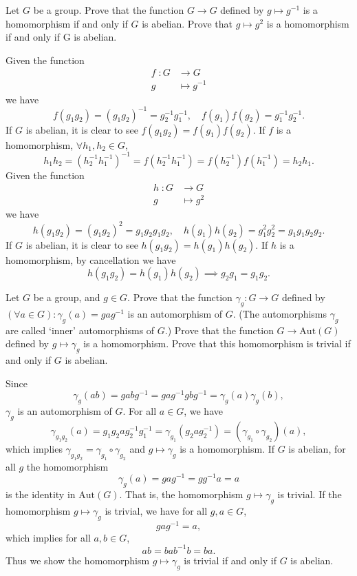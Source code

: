 \documentclass[12pt,letterpaper,boxed]{hmcpset}
\begin{document}
\begin{problem}[4.7]	
	Let $G$ be a group. Prove that the function $G\rightarrow G$ defined by $g\mapsto g^{-1}$ is a homomorphism if and only if $G$ is abelian. Prove that $g\mapsto g^2$ is a homomorphism
	if and only if G is abelian.
\end{problem}
\begin{solution}
	Given the function
	\[
	\begin{aligned}
	f\;: G&\longrightarrow G\\  
	g&\longmapsto g^{-1}
	\end{aligned}
	\]
	we have
	\[
	f(g_1g_2)=(g_1g_2)^{-1}=g_2^{-1}g_1^{-1},\quad	f(g_1)f(g_2)=g_1^{-1}g_2^{-1}.
	\]
	If $G$ is abelian, it is clear to see $f(g_1g_2)=f(g_1)f(g_2)$. If $f$ is a homomorphism, $\forall h_1,h_2\in G$,
	\[
	h_1h_2=(h_2^{-1}h_1^{-1})^{-1}=f(h_2^{-1}h_1^{-1})=f(h_2^{-1})f(h_1^{-1})=h_2h_1.
	\]
	Given the function
	\[
	\begin{aligned}
	h\;: G&\longrightarrow G\\  
	g&\longmapsto g^{2}
	\end{aligned}
	\]
	we have
	\[
	h(g_1g_2)=(g_1g_2)^{2}=g_1g_2g_1g_2,\quad h(g_1)h(g_2)=g_1^2g_2^2=g_1g_1g_2g_2.
	\]
	If $G$ is abelian, it is clear to see $h(g_1g_2)=h(g_1)h(g_2)$. If $h$ is a homomorphism, by cancellation we have 
	\[
	h(g_1g_2)=h(g_1)h(g_2)\implies g_2g_1=g_1g_2.
	\]
\end{solution}


\hypertarget{Exercise II.4.8}{}
\begin{problem}[4.8]
Let $G$ be a group, and $g\in G$. Prove that the function $\gamma_g : G\rightarrow G$ defined by $(\forall a \in G) : \gamma_g(a) = gag^{-1}$ is an automorphism of $G$. (The automorphisms $\gamma_g$ are
called \textquoteleft inner' automorphisms of $G$.) Prove that the function $G\rightarrow \mathrm{Aut}(G)$ defined by $g \mapsto \gamma_g$ is a homomorphism. Prove that this homomorphism is trivial if and only if $G$ is abelian.
\end{problem}
\begin{solution}
Since
\[
\gamma_g(ab)=gabg^{-1}=gag^{-1}gbg^{-1}=\gamma_g(a)\gamma_g(b),
\]
$\gamma_g$ is an automorphism of $G$. 
For all $a\in G$, we have
\[
\gamma_{g_1g_2}(a)=g_1g_2ag_2^{-1}g_1^{-1}=\gamma_{g_1}(g_2ag_2^{-1})=(\gamma_{g_1}\circ \gamma_{g_2})(a),
\]
which implies $\gamma_{g_1g_2}=\gamma_{g_1}\circ \gamma_{g_2}$ and $g \mapsto\gamma_g$ is a homomorphism. If $G$ is abelian, for all $g$ the homomorphism
\[
\gamma_g(a) = gag^{-1}=gg^{-1}a=a
\] 
is the identity in $\mathrm{Aut}(G)$. That is, the homomorphism $g \mapsto \gamma_g$ is  trivial. If the homomorphism $g \mapsto \gamma_g$ is  trivial, we have for all $g,a\in G$,
\[
gag^{-1}=a,
\] 
which implies for all $a,b\in G$,
\[
ab=bab^{-1}b=ba.
\]
Thus we show the homomorphism $g \mapsto \gamma_g$ is trivial if and only if $G$ is abelian.
\end{solution}
\end{document}

